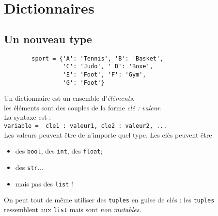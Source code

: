 \chapter{Dictionnaires}
\section{Un nouveau type}

\begin{pyc}
    \begin{verbatim}
        sport = {'A': 'Tennis', 'B': 'Basket',
                 'C': 'Judo', ' D': 'Boxe',
                 'E': 'Foot', 'F': 'Gym',
                 'G': 'Foot'}
        \end{verbatim}
\end{pyc}


\begin{definition}[ : dictionnaire]
    Un dictionnaire est un ensemble d'\textit{éléments}.\\
    les éléments sont des couples de la forme \textit{clé : valeur}.\\

    La syntaxe est :\\ \texttt{variable = { cle1 : valeur1, cle2 : valeur2, ...}}\\

    Les valeurs peuvent être de n'importe quel type. Les clés peuvent être
    \begin{itemize}
        \item 	des \texttt{bool}, des \texttt{int}, des \texttt{float};
        \item 	des \texttt{str}...
        \item 	mais pas des \texttt{list} !
    \end{itemize}
\end{definition}


On peut tout de même utiliser des \texttt{tuples} en guise de clés :  les \texttt{tuples} ressemblent aux \texttt{list} mais sont \textit{non mutables}.\\

